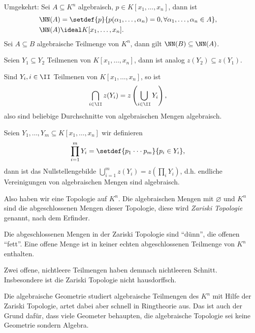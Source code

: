 \begin{bsp}
\begin{enumerate}[label=\arabic{*}.]
Umgekehrt: Sei $A\subseteq K^n$ algebraisch, $p\in K[x_1,\ldots,x_n]$, dann ist
\begin{align*}
\NN(A) &= \setdef{p}{p(\alpha_1,\ldots,\alpha_n) = 0,
\forall \alpha_1,\ldots,\alpha_n \in A},\\
\NN(A) &\ideal K[x_1,\ldots,x_n].
\end{align*}
Sei $A\subseteq B$ algebraische Teilmenge von $K^n$, dann gilt $\NN(B) \subseteq
\NN(A)$.

Seien $Y_1\subseteq Y_2$ Teilmenen von $K[x_1,\ldots,x_n]$, dann ist analog
$z(Y_2)\subseteq z(Y_1)$.

Sind $Y_i, i\in\II$ Teilmenen von $K[x_1,\ldots,x_n]$, so ist
\begin{align*}
\bigcap\limits_{i\in\II} z(Y_i) = z\left(\bigcup\limits_{i\in\II} Y_i \right), 
\end{align*}
also sind beliebige Durchschnitte von algebraischen Mengen algebraisch.

Seien $Y_1,\ldots,Y_m\subseteq K[x_1,\ldots,x_n]$ wir definieren
\begin{align*}
\prod\limits_{i=1}^m Y_i = \setdef{p_1\cdot\cdot\cdot p_m}{p_i\in Y_i},
\end{align*}
dann ist das Nullstellengebilde $\bigcup\limits_{i=1}^m z(Y_i) = z(\prod_i
Y_i)$, d.h. endliche Vereinigungen von algebraischen Mengen sind algebraisch.

Also haben wir eine Topologie auf $K^n$. Die algebraischen Mengen mit
$\varnothing$ und $K^n$ sind die abgeschlossenen Mengen dieser Topologie, diese
wird \emph{Zariski Topologie} genannt, nach dem Erfinder.

\begin{bemn}
Die abgeschlossenen Mengen in der Zariski Topologie sind ``dünn'', die offenen
``fett''. Eine offene Menge ist in keiner echten abgeschlossenen Teilmenge von
$K^n$ enthalten.

Zwei offene, nichtleere Teilmengen haben demnach nichtleeren Schnitt.
Insbesondere ist die Zariski Topologie nicht hausdorffsch.\maphere
\end{bemn}

Die algebraische Geometrie studiert algebraische Teilmengen des $K^n$ mit Hilfe
der Zariski Topologie, artet dabei aber schnell in Ringtheorie aus. Das ist
auch der Grund dafür, dass viele Geometer behaupten, die algebraische Topologie
sei keine Geometrie sondern Algebra.\bsphere
\end{enumerate}
\end{bsp}

